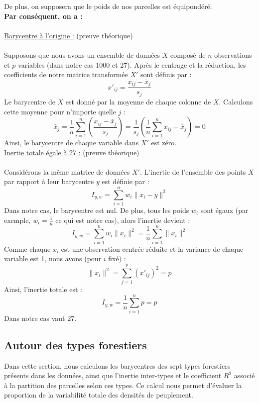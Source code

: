 \documentclass{article}
\begin{document}
De plus, on supposera que le poids de nos parcelles est équipondéré.
\vspace{2\baselineskip}
\\
\textbf{Par conséquent, on a :}
\\
\\
\indent\underline{Barycentre à l'origine :} (preuve théorique)
\\
\\
Supposons que nous avons un ensemble de données \(X\) composé de \(n\) observations et \(p\) variables (dans notre cas 1000 et 27). Après le centrage et la réduction, les coefficients de notre matrice transformée \(X'\) sont définis par :
\[
x'_{ij} = \frac{x_{ij} - \bar{x}_j}{s_j}
\]
Le barycentre de \(X\) est donné par la moyenne de chaque colonne de \(X\). Calculons cette moyenne pour n'importe quelle \(j\) :
\[
\bar{x}_j = \frac{1}{n} \sum_{i=1}^n \left( \frac{x_{ij} - \bar{x}_j}{s_j} \right) = \frac{1}{s_j} \left( \frac{1}{n} \sum_{i=1}^n x_{ij} - \bar{x}_j \right) = 0
\]
Ainsi, le barycentre de chaque variable dans \(X'\) est zéro.
\\


\underline{Inertie totale égale à 27 : } (preuve théorique)
\\
\\
Considérons la même matrice de données \(X'\). L'inertie de l'ensemble des points \(X\) par rapport à leur barycentre \(y\) est définie par :
\[
I_{y,w} = \sum_{i=1}^n w_i \|x_i - y\|^2
\]
Dans notre cas, le barycentre est nul. De plus, tous les poids \(w_i\) sont égaux (par exemple, \(w_i = \frac{1}{n}\) ce qui est notre cas), alors l'inertie devient :
\[
I_{y,w} = \sum_{i=1}^n w_i \|x_i\|^2 = \frac{1}{n} \sum_{i=1}^n \|x_i\|^2
\]
Comme chaque \(x_i\) est une observation centrée-réduite et la variance de chaque variable est 1, nous avons (pour \(i\) fixé) :
\[
\|x_i\|^2 = \sum_{j=1}^p (x'_{ij})^2 = p
\]
Ainsi, l'inertie totale est :
\[
I_{y,w} = \frac{1}{n} \sum_{i=1}^n p = p
\]
Dans notre cas vaut 27.

\subsection{Autour des types forestiers}

Dans cette section, nous calculons les barycentres des sept types forestiers présents dans les données, ainsi que l'inertie inter-types et le coefficient $R^2$
 associé à la partition des parcelles selon ces types. Ce calcul nous permet d'évaluer la proportion de la variabilité totale des densités de peuplement.
\end{document}
